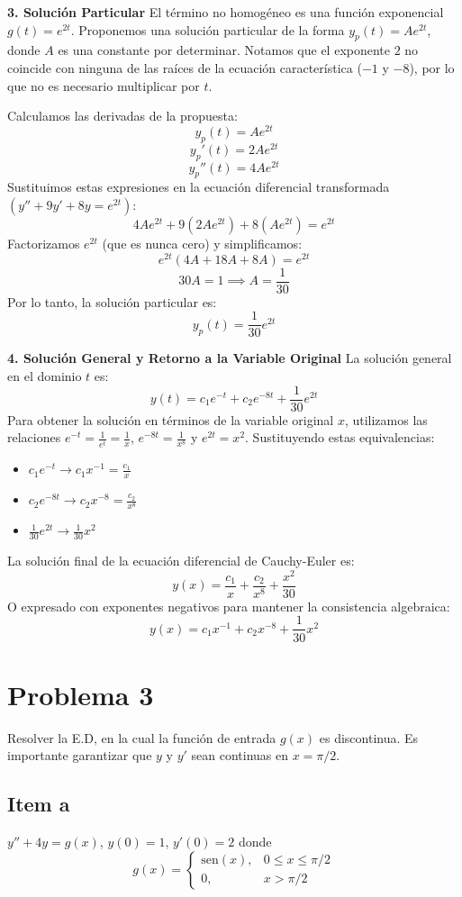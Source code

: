 \documentclass[a4paper]{article}
\begin{document}
\textbf{3. Solución Particular}
El término no homogéneo es una función exponencial $g(t) = e^{2t}$. Proponemos una solución particular de la forma $y_p(t) = A e^{2t}$, donde $A$ es una constante por determinar. Notamos que el exponente $2$ no coincide con ninguna de las raíces de la ecuación característica ($-1$ y $-8$), por lo que no es necesario multiplicar por $t$.

Calculamos las derivadas de la propuesta:
$$
y_p(t) = A e^{2t}
$$
$$
y_p'(t) = 2A e^{2t}
$$
$$
y_p''(t) = 4A e^{2t}
$$
Sustituimos estas expresiones en la ecuación diferencial transformada $(y'' + 9y' + 8y = e^{2t})$:
$$
4A e^{2t} + 9(2A e^{2t}) + 8(A e^{2t}) = e^{2t}
$$
Factorizamos $e^{2t}$ (que es nunca cero) y simplificamos:
$$
e^{2t} (4A + 18A + 8A) = e^{2t}
$$
$$
30A = 1 \implies A = \frac{1}{30}
$$
Por lo tanto, la solución particular es:
$$
y_p(t) = \frac{1}{30} e^{2t}
$$

\textbf{4. Solución General y Retorno a la Variable Original}
La solución general en el dominio $t$ es:
$$
y(t) = c_1 e^{-t} + c_2 e^{-8t} + \frac{1}{30} e^{2t}
$$
Para obtener la solución en términos de la variable original $x$, utilizamos las relaciones $e^{-t} = \frac{1}{e^t} = \frac{1}{x}$, $e^{-8t} = \frac{1}{x^8}$ y $e^{2t} = x^2$. Sustituyendo estas equivalencias:
\begin{itemize}
    \item $c_1 e^{-t} \rightarrow c_1 x^{-1} = \frac{c_1}{x}$
    \item $c_2 e^{-8t} \rightarrow c_2 x^{-8} = \frac{c_2}{x^8}$
    \item $\frac{1}{30} e^{2t} \rightarrow \frac{1}{30} x^2$
\end{itemize}
La solución final de la ecuación diferencial de Cauchy-Euler es:
$$
y(x) = \frac{c_1}{x} + \frac{c_2}{x^8} + \frac{x^2}{30}
$$
O expresado con exponentes negativos para mantener la consistencia algebraica:
$$
y(x) = c_1 x^{-1} + c_2 x^{-8} + \frac{1}{30} x^2
$$

\section{Problema 3}
Resolver la E.D, en la cual la función de entrada $g(x)$ es discontinua. Es importante garantizar que $y$ y $y'$ sean continuas en $x = \pi/2$.

\subsection{Item a}
$y'' + 4y = g(x)$, $y(0) = 1$, $y'(0) = 2$ donde
$$
g(x) = \begin{cases} 
\text{sen}(x), & 0 \leq x \leq \pi/2 \\
0, & x > \pi/2 
\end{cases}
$$
\end{document}
